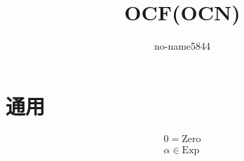 \documentclass[UTF8]{ctexart}
\title{OCF(OCN)}
\author{no-name5844}
\begin{document}
\maketitle

\section{通用}
\begin{gather*}
0=\mathrm{Zero}\\
\alpha\in\mathrm{Exp}
\end{gather*}
\end{document}
